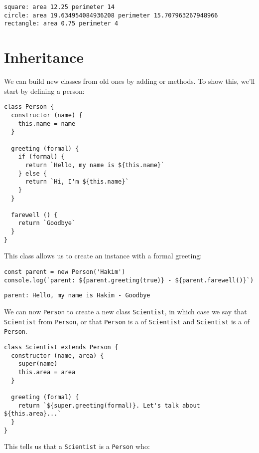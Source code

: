 \begin{verbatim}
square: area 12.25 perimeter 14
circle: area 19.634954084936208 perimeter 15.707963267948966
rectangle: area 0.75 perimeter 4
\end{verbatim}

\section{Inheritance}\label{s:oop-inheritance}

We can build new classes from old ones by adding or  methods.
To show this,
we'll start by defining a person:

\begin{verbatim}
class Person {
  constructor (name) {
    this.name = name
  }

  greeting (formal) {
    if (formal) {
      return `Hello, my name is ${this.name}`
    } else {
      return `Hi, I'm ${this.name}`
    }
  }

  farewell () {
    return `Goodbye`
  }
}
\end{verbatim}

This class allows us to create an instance with a formal greeting:

\begin{verbatim}
const parent = new Person('Hakim')
console.log(`parent: ${parent.greeting(true)} - ${parent.farewell()}`)
\end{verbatim}

\begin{verbatim}
parent: Hello, my name is Hakim - Goodbye
\end{verbatim}

We can now  \texttt{Person} to create a new class \texttt{Scientist},
in which case we say that \texttt{Scientist}  from \texttt{Person},
or that \texttt{Person} is a  of \texttt{Scientist}
and \texttt{Scientist} is a  of \texttt{Person}.

\begin{verbatim}
class Scientist extends Person {
  constructor (name, area) {
    super(name)
    this.area = area
  }

  greeting (formal) {
    return `${super.greeting(formal)}. Let's talk about ${this.area}...`
  }
}
\end{verbatim}

This tells us that a \texttt{Scientist} is a \texttt{Person} who:

